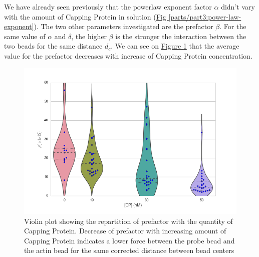 \documentclass[A4paperpaper,11pt,english]{sphinxmanual}
\begin{document}
We have already seen previously that the powerlaw exponent factor \(\alpha\)
didn't vary with the amount of Capping Protein in solution (\hyperref[parts/part3:power-law-exponent]{Fig  \ref*{parts/part3:power-law-exponent}}).
The two other parameters investigated are the prefactor
\(\beta\). For the same value of \(\alpha\) and \(\delta\), the
higher \(\beta\) is the stronger the interaction between the two beads for
the same distance \(d_c\). We can see on \hyperref[parts/part3:beta-violin]{Figure  \ref*{parts/part3:beta-violin}} that the
average value for the prefactor decreases with increase of Capping Protein
concentration.
\begin{figure}[htbp]
\centering
\capstart

\includegraphics[width=0.800\linewidth]{beta_violin.png}
\caption{Violin plot showing the repartition of prefactor with the quantity of
Capping Protein. Decrease of prefactor with increasing amount of Capping
Protein indicates a lower force between the probe bead and the actin bead
for the same corrected distance between bead centers}\label{parts/part3:beta-violin}\end{figure}
\end{document}
